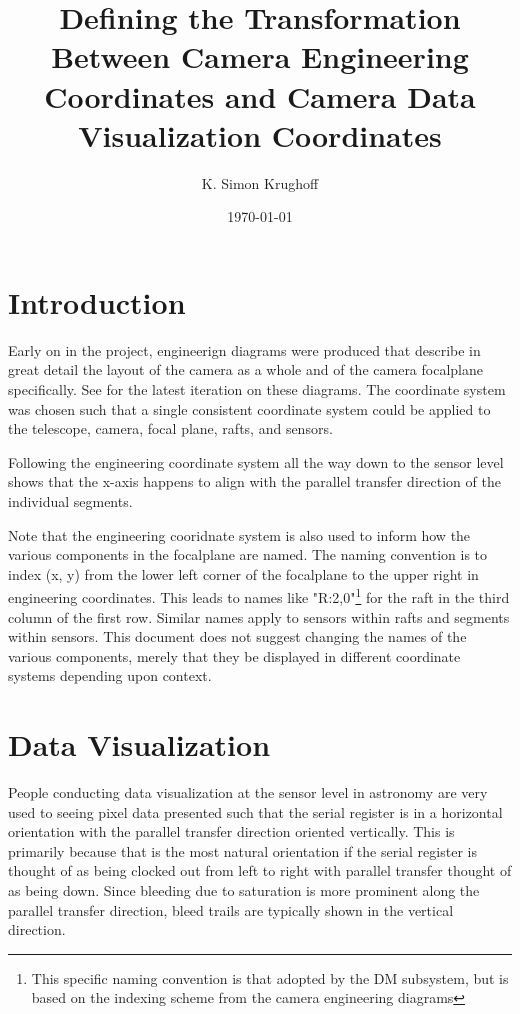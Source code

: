 \documentclass[SE,lsstdraft,toc]{lsstdoc}
\title{Defining the Transformation Between Camera Engineering Coordinates and Camera Data Visualization Coordinates}
\author{%
K. Simon Krughoff
}
\date{\today}
\begin{document}
\maketitle




\section{Introduction}
Early on in the project, engineerign diagrams were produced that describe in great detail the layout of the camera as a whole and of the camera focalplane specifically. See  for the latest iteration on these diagrams. The coordinate system was chosen such that a single consistent coordinate system could be applied to the telescope, camera, focal plane, rafts, and sensors.

Following the engineering coordinate system all the way down to the sensor level shows that the x-axis happens to align with the parallel transfer direction of the individual segments.

Note that the engineering cooridnate system is also used to inform how the various components in the focalplane are named. The naming convention is to index (x, y) from the lower left corner of the focalplane to the upper right in engineering coordinates. This leads to names like "R:2,0"\footnote{This specific naming convention is that adopted by the DM subsystem, but is based on the indexing scheme from the camera engineering diagrams} for the raft in the third column of the first row. Similar names apply to sensors within rafts and segments within sensors. This document does not suggest changing the names of the various components, merely that they be displayed in different coordinate systems depending upon context.

\section{Data Visualization}
People conducting data visualization at the sensor level in astronomy are very used to seeing pixel data presented such that the serial register is in a horizontal orientation with the parallel transfer direction oriented vertically. This is primarily because that is the most natural orientation if the serial register is thought of as being clocked out from left to right with parallel transfer thought of as being down. Since bleeding due to saturation is more prominent along the parallel transfer direction, bleed trails are typically shown in the vertical direction.
\end{document}

